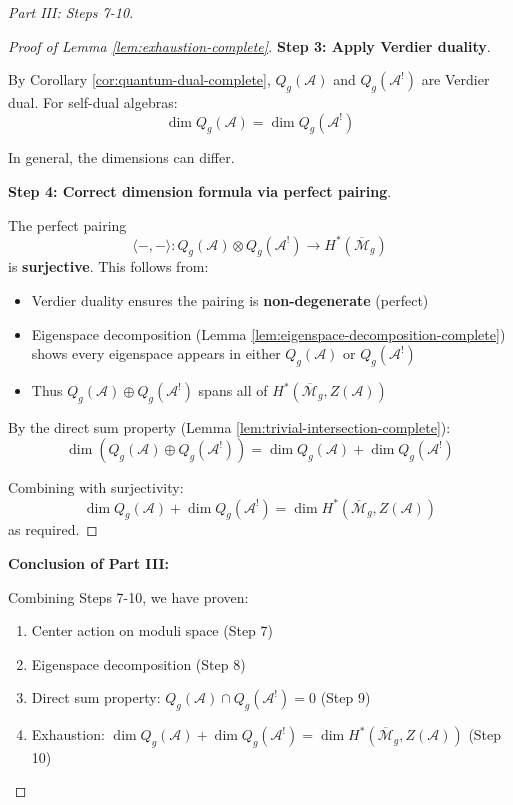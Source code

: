 \begin{proof}[Part III: Steps 7-10]
\begin{proof}[Proof of Lemma \ref{lem:exhaustion-complete}]
\textbf{Step 3: Apply Verdier duality}.

By Corollary \ref{cor:quantum-dual-complete}, $Q_g(\mathcal{A})$ and $Q_g(\mathcal{A}^!)$ are 
Verdier dual. For self-dual algebras:
\begin{equation}
\dim Q_g(\mathcal{A}) = \dim Q_g(\mathcal{A}^!)
\end{equation}

In general, the dimensions can differ.

\textbf{Step 4: Correct dimension formula via perfect pairing}.

The perfect pairing
\begin{equation}
\langle -, - \rangle: Q_g(\mathcal{A}) \otimes Q_g(\mathcal{A}^!) \to H^*(\overline{
\mathcal{M}}_g)
\end{equation}
is \textbf{surjective}. This follows from:
\begin{itemize}
\item Verdier duality ensures the pairing is \textbf{non-degenerate} (perfect)
\item Eigenspace decomposition (Lemma \ref{lem:eigenspace-decomposition-complete}) shows every 
eigenspace appears in either $Q_g(\mathcal{A})$ or $Q_g(\mathcal{A}^!)$
\item Thus $Q_g(\mathcal{A}) \oplus Q_g(\mathcal{A}^!)$ spans all of $H^*(\overline{
\mathcal{M}}_g, Z(\mathcal{A}))$
\end{itemize}

By the direct sum property (Lemma \ref{lem:trivial-intersection-complete}):
\begin{equation}
\dim(Q_g(\mathcal{A}) \oplus Q_g(\mathcal{A}^!)) = \dim Q_g(\mathcal{A}) + \dim Q_g(
\mathcal{A}^!)
\end{equation}

Combining with surjectivity:
\begin{equation}
\dim Q_g(\mathcal{A}) + \dim Q_g(\mathcal{A}^!) = \dim H^*(\overline{\mathcal{M}}_g, 
Z(\mathcal{A}))
\end{equation}
as required.
\end{proof}

\textbf{Conclusion of Part III:}

Combining Steps 7-10, we have proven:
\begin{enumerate}
\item Center action on moduli space (Step 7)
\item Eigenspace decomposition (Step 8)
\item Direct sum property: $Q_g(\mathcal{A}) \cap Q_g(\mathcal{A}^!) = 0$ (Step 9)
\item Exhaustion: $\dim Q_g(\mathcal{A}) + \dim Q_g(\mathcal{A}^!) = \dim H^*(\overline{
\mathcal{M}}_g, Z(\mathcal{A}))$ (Step 10)
\end{enumerate}


\end{proof}
